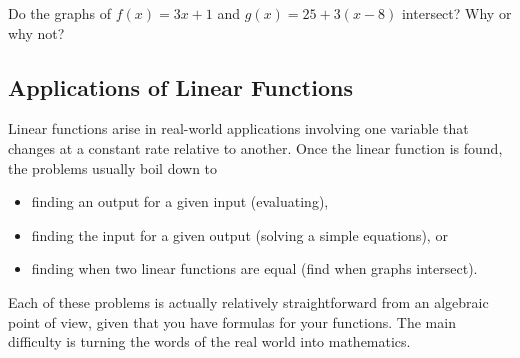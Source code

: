 \begin{question} Do the graphs of $f(x) = 3x+1$ and $g(x) = 25 + 3(x-8)$ intersect? Why or why not?
\end{question}

\subsection{Applications of Linear Functions}

Linear functions arise in real-world applications involving one variable that changes at a constant rate relative to another. Once the linear function is found, the problems usually boil down to 
\begin{itemize}
\item finding an output for a given input (evaluating),
\item finding the input for a given output (solving a simple equations), or
\item finding when two linear functions are equal (find when graphs intersect).
\end{itemize}

Each of these problems is actually relatively straightforward from an algebraic point of view, given that you have formulas for your functions. The main difficulty is turning the words of the real world into mathematics. 

\par

